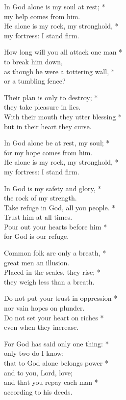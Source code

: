 
In God alone is my soul at rest; *\\
my help comes from him.\\
He alone is my rock, my stronghold, *\\
my fortress: I stand firm.

How long will you all attack one man *\\
to break him down,\\
as though he were a tottering wall, *\\
or a tumbling fence?

Their plan is only to destroy; *\\
they take pleasure in lies.\\
With their mouth they utter blessing *\\
but in their heart they curse.

In God alone be at rest, my soul; *\\
for my hope comes from him.\\
He alone is my rock, my stronghold, *\\
my fortress: I stand firm.

In God is my safety and glory, *\\
the rock of my strength.\\
Take refuge in God, all you people. *\\
Trust him at all times.\\
Pour out your hearts before him *\\
for God is our refuge.

Common folk are only a breath, *\\
great men an illusion.\\
Placed in the scales, they rise; *\\
they weigh less than a breath.

Do not put your trust in oppression *\\
nor vain hopes on plunder.\\
Do not set your heart on riches *\\
even when they increase.

For God has said only one thing: *\\
only two do I know:\\
that to God alone belongs power *\\
and to you, Lord, love;\\
and that you repay each man *\\
according to his deeds.